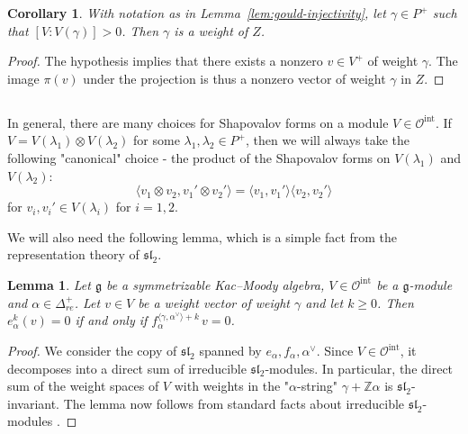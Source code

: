 \documentclass[12pt,reqno]{amsart}
\theoremstyle{plain}
\newtheorem{corollary}[theorem]{Corollary}
\newtheorem{lemma}[theorem]{Lemma}
\theoremstyle{definition}
\theoremstyle{remark}
\theoremstyle{plain}
\newcommand{\posreal}[1][+]{\Delta_{re}^{#1}}
\newcommand{\catoint}{\mathcal{O}^{\mathrm{int}}}
\begin{document}
\begin{corollary}\label{cor:hwtVZ}
    With notation as in Lemma~\ref{lem:gould-injectivity}, let $\gamma\in P^+$ such that $[V:V(\gamma)] >0$. Then $\gamma$ is a weight of $Z$. 
\end{corollary}
\begin{proof}
    The hypothesis implies that there exists a nonzero $v \in V^+$ of weight $\gamma$. The image $\pi(v)$ under the projection is thus a nonzero vector of weight $\gamma$ in $Z$.
    \end{proof}
\subsection{}
In general, there are many choices for Shapovalov forms on a module $V \in \catoint$. If $V = V(\lambda_1) \otimes V(\lambda_2)$ for some $\lambda_1, \lambda_2 \in P^+$, then we will always take the following "canonical" choice - the product of the Shapovalov forms on $V(\lambda_1)$ and $V(\lambda_2)$:
\[\langle v_1\otimes v_2, v_1'\otimes v_2'\rangle = \langle v_1,v_1' \rangle \langle v_2,v_2' \rangle\]
for $v_i, v_i' \in V(\lambda_i)$ for $i=1, 2$.


We will also need the following lemma, which is a simple fact from the representation theory of $\mathfrak{sl}_2$.
\begin{lemma}\label{lem:sl2string}
Let $\mathfrak{g}$ be a symmetrizable Kac--Moody algebra, $V \in \catoint$ be a $\mathfrak{g}$-module and $\alpha \in \posreal$. Let $v \in V$ be a weight vector of weight $\gamma$ and let $k \geq 0$. Then $e_\alpha^k(v) =0$ if and only if $f_\alpha^{\langle \gamma, \alpha^\vee \rangle + k}\, v =0$.
\end{lemma}
\begin{proof}
We consider the copy of $\mathfrak{sl}_2$ spanned by $e_\alpha, f_\alpha, \alpha^\vee$.
Since $V \in \catoint$, it decomposes into a direct sum of irreducible $\mathfrak{sl}_2$-modules. In particular, the direct sum of the weight spaces of $V$ with weights in the "$\alpha$-string" $\gamma + \mathbb{Z}\alpha$ is $\mathfrak{sl}_2$-invariant. The lemma now follows from standard facts about irreducible $\mathfrak{sl}_2$-modules \cite{Hum1}.
\end{proof}
\end{document}
